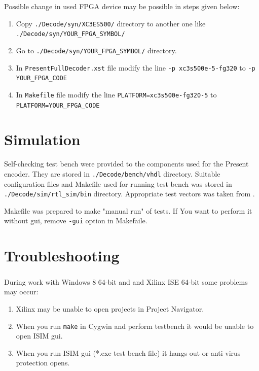 \documentclass{gajewski}
\begin{document}
Possible change in used FPGA device may be possible in steps given below\footnotemark[1]:
\begin{enumerate}
    \item Copy \texttt{./Decode/syn/XC3ES500/} directory to another one like \texttt{./Decode/syn/YOUR\_FPGA\_SYMBOL/}
    \item Go to \texttt{./Decode/syn/YOUR\_FPGA\_SYMBOL/}  directory.
    \item In \texttt{PresentFullDecoder.xst} file modify the line \texttt{-p xc3s500e-5-fg320} to \texttt{-p YOUR\_FPGA\_CODE}
    \item In \texttt{Makefile} file modify the line \texttt{PLATFORM=xc3s500e-fg320-5} to \texttt{PLATFORM=YOUR\_FPGA\_CODE}
\end{enumerate}



\newpage

\section{Simulation}

Self-checking test bench were provided to the components used for the Present encoder. They are stored in \texttt{./Decode/bench/vhdl} directory. Suitable configuration files and Makefile used for running test bench was stored in 
\texttt{./Decode/sim/rtl\_sim/bin} directory. Appropriate test vectors was taken from \cite{PRESENT}.

Makefile was prepared to make "manual run" of tests. If You want to perform it without gui, remove \texttt{-gui} option in Makefaile.

\newpage

\section{Troubleshooting}

During work with Windows 8 64-bit and and Xilinx\textsuperscript{\textregistered} ISE 64-bit some problems may occur:

\begin{enumerate}
    \item Xilinx may be unable to open projects in Project Navigator.
    \item When you run \texttt{make} in Cygwin and perform testbench it would be unable to open ISIM gui.
    \item When you run ISIM gui  (*.exe test bench file) it hangs out or anti virus protection opens.
\end{enumerate}
\end{document}
